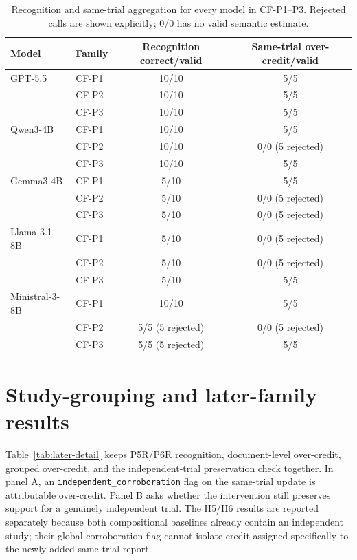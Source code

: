 \documentclass[11pt]{article}
\begin{document}
\begin{table}[t]
\centering
\small
\begin{tabular}{@{}llcc@{}}
\toprule
Model & Family & Recognition correct/valid & Same-trial over-credit/valid \\
\midrule
GPT-5.5 & CF-P1 & 10/10 & 5/5 \\
          & CF-P2 & 10/10 & 5/5 \\
          & CF-P3 & 10/10 & 5/5 \\
\addlinespace[2pt]
Qwen3-4B & CF-P1 & 10/10 & 5/5 \\
         & CF-P2 & 10/10 & 0/0 (5 rejected) \\
         & CF-P3 & 10/10 & 5/5 \\
\addlinespace[2pt]
Gemma3-4B & CF-P1 & 5/10 & 5/5 \\
          & CF-P2 & 5/10 & 0/0 (5 rejected) \\
          & CF-P3 & 5/10 & 0/0 (5 rejected) \\
\addlinespace[2pt]
Llama-3.1-8B & CF-P1 & 5/10 & 0/0 (5 rejected) \\
              & CF-P2 & 5/10 & 0/0 (5 rejected) \\
              & CF-P3 & 5/10 & 5/5 \\
\addlinespace[2pt]
Ministral-3-8B & CF-P1 & 10/10 & 5/5 \\
                 & CF-P2 & 5/5 (5 rejected) & 0/0 (5 rejected) \\
                 & CF-P3 & 5/5 (5 rejected) & 5/5 \\
\bottomrule
\end{tabular}
\caption{Recognition and same-trial aggregation for every model in CF-P1--P3. Rejected calls are shown explicitly; 0/0 has no valid semantic estimate.}
\label{tab:original-provenance-detail}
\end{table}

\section{Study-grouping and later-family results}
\label{app:later-detail}

Table~\ref{tab:later-detail} keeps P5R/P6R recognition, document-level over-credit, grouped over-credit, and the independent-trial preservation check together. In panel A, an \texttt{independent\_corroboration} flag on the same-trial update is attributable over-credit. Panel B asks whether the intervention still preserves support for a genuinely independent trial. The H5/H6 results are reported separately because both compositional baselines already contain an independent study; their global corroboration flag cannot isolate credit assigned specifically to the newly added same-trial report.
\end{document}
